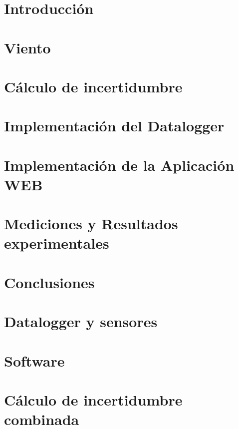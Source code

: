 \documentclass[11pt, a4paper,oneside]{book}
\begin{document}


\clearpage\hbox{}\thispagestyle{empty}\newpage

\clearpage\hbox{}\thispagestyle{empty}\newpage

\clearpage\hbox{}\thispagestyle{empty}\newpage

\clearpage\hbox{}\thispagestyle{empty}\newpage
\tableofcontents
\listoffigures
\listoftables
\newpage

\setcounter{page}{1}

\chapter{Introducción}\label{cap:introduccion}


\chapter{Viento}\label{cap:viento}

\chapter{Cálculo de incertidumbre}\label{cap:incertidumbre}

\chapter{Implementación del Datalogger}\label{cap:datalogger}

\chapter{Implementación de la Aplicación WEB}\label{cap:aplicacionweb}

\chapter{Mediciones y Resultados experimentales}\label{cap:med_result}



\chapter{Conclusiones}



\appendix
\chapter{Datalogger y sensores}

\chapter{Software}

\chapter{Cálculo de incertidumbre combinada}

\printbibliography
\end{document}
